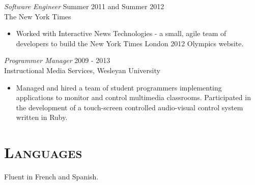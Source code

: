 \documentclass[margin]{res}
\begin{document}
\begin{resume}
    {\sl Software Engineer} \hfill Summer 2011 and Summer 2012 \\
    The New York Times
    \begin{itemize}  \itemsep -2pt %
        \item Worked with Interactive News Technologies - a small, agile team of developers to build the New York Times London 2012 Olympics website.
    \end{itemize}

    {\sl Programmer Manager} \hfill 2009 - 2013 \\
    Instructional Media Services, Wesleyan University
    \begin{itemize}  \itemsep -2pt %
        \item Managed and hired a team of student programmers implementing applications to monitor and control multimedia classrooms. Participated in the development of a touch-screen controlled audio-visual control system written in Ruby.
    \end{itemize}

\section{\textsc{Languages}} Fluent in French and Spanish.

\end{resume}
\end{document}
